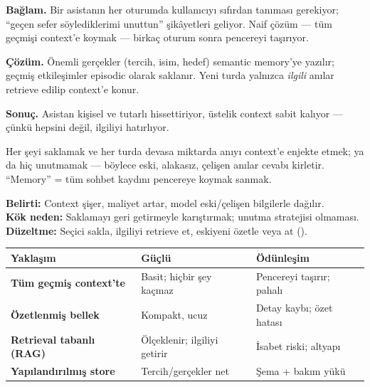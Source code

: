 \begin{prodbox}
\textbf{Bağlam.} Bir asistanın her oturumda kullanıcıyı sıfırdan tanıması
gerekiyor; ``geçen sefer söylediklerimi unuttun'' şikâyetleri geliyor. Naif
çözüm --- tüm geçmişi context'e koymak --- birkaç oturum sonra pencereyi taşırıyor.

\smallskip
\textbf{Çözüm.} Önemli gerçekler (tercih, isim, hedef) semantic memory'ye yazılır;
geçmiş etkileşimler episodic olarak saklanır. Yeni turda yalnızca \emph{ilgili}
anılar retrieve edilip context'e konur.

\smallskip
\textbf{Sonuç.} Asistan kişisel ve tutarlı hissettiriyor, üstelik context sabit
kalıyor --- çünkü hepsini değil, ilgiliyi hatırlıyor.
\end{prodbox}

\begin{antibox}
Her şeyi saklamak ve her turda devasa miktarda anıyı context'e enjekte etmek;
ya da hiç unutmamak --- böylece eski, alakasız, çelişen anılar cevabı kirletir.
``Memory'' = tüm sohbet kaydını pencereye koymak sanmak.

\smallskip
\textbf{Belirti:} Context şişer, maliyet artar, model eski/çelişen bilgilerle dağılır.\\
\textbf{Kök neden:} Saklamayı geri getirmeyle karıştırmak; unutma stratejisi olmaması.\\
\textbf{Düzeltme:} Seçici sakla, ilgiliyi retrieve et, eskiyeni özetle veya at ().
\end{antibox}

\vspace{2pt}
\begin{tabularx}{\linewidth}{@{}>{\raggedright\arraybackslash}p{32mm} L L@{}}
\toprule
{\sffamily\bfseries\small Yaklaşım} & {\sffamily\bfseries\small Güçlü} & {\sffamily\bfseries\small Ödünleşim} \\
\midrule
\textbf{Tüm geçmiş context'te} & Basit; hiçbir şey kaçmaz & Pencereyi taşırır; pahalı \\
\addlinespace[2pt]
\textbf{Özetlenmiş bellek} & Kompakt, ucuz & Detay kaybı; özet hatası \\
\addlinespace[2pt]
\textbf{Retrieval tabanlı (RAG)} & Ölçeklenir; ilgiliyi getirir & İsabet riski; altyapı \\
\addlinespace[2pt]
\textbf{Yapılandırılmış store} & Tercih/gerçekler net & Şema + bakım yükü \\
\bottomrule
\end{tabularx}


